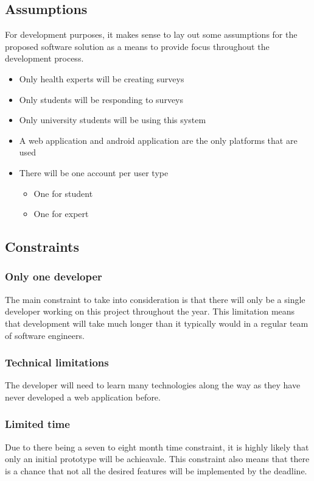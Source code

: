 \subsection{Assumptions}
For development purposes, it makes sense to lay out some assumptions for the proposed software solution as a means to provide focus throughout the development process.

\begin{itemize}
    \tightlist
    \item Only health experts will be creating surveys
    \item Only students will be responding to surveys
    \item Only university students will be using this system
    \item A web application and android application are the only platforms that are used
    \item There will be one account per user type
    \begin{itemize}
        \item One for student
        \item One for expert
    \end{itemize}
\end{itemize}


\subsection{Constraints}

\subsubsection*{Only one developer}
The main constraint to take into consideration is that there will only be a single developer working on this project throughout the year.
This limitation means that development will take much longer than it typically would in a regular team of software engineers.

\subsubsection*{Technical limitations}
The developer will need to learn many technologies along the way as they have never developed a web application before.

\subsubsection*{Limited time}
Due to there being a seven to eight month time constraint, it is highly likely that only an initial prototype will be achieavale.
This constraint also means that there is a chance that not all the desired features will be implemented by the deadline. 


